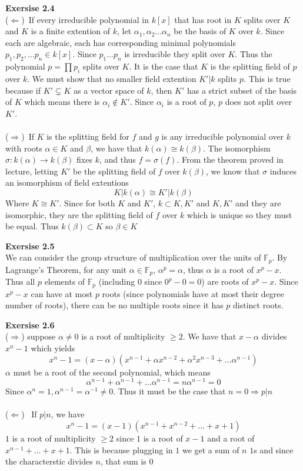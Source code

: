 \documentclass[12pt]{article}
\newenvironment{ques}[1]{\textbf{Exersise #1}\vspace{1 mm}\\ }{\bigskip}
\theoremstyle{definition}
\newcommand{\F}{\mathbb F}
\renewcommand{\a}{\alpha}
\begin{document}
\begin{ques}{2.4}
	($\Leftarrow$)\ If every irreducible polynomial in $k[x]$ that has root in
	$K$ splits over $K$ and $K$ is a finite extention of $k$, let $\a_1, \a_2
	\dots \a_n$ be the basis of $K$ over $k$. Since each are algebraic, each
	has corresponding minimal polynomials $p_1, p_2, \dots p_n \in k[x]$. Since
	$p_1 \dots p_n$ is irreducible they split over $K$. Thus the polynomial $p
	= \prod p_i$ splits over $K$. It is the case that $K$ is the splitting
	field of $p$ over $k$. We must show that no smaller field extention $K'|k$
	splits $p$. This is true because if $K' \subsetneq K$ as a vector space of
	$k$, then $K'$ has a strict subset of the basis of $K$ which means there is
	$\a_i \notin K'$. Since $\a_i$ is a root of $p$, $p$ does not split over $K'$.
	\\
	\\
	($\Rightarrow$)\ If $K$ is the splitting field for $f$ and $g$ is any
	irreducible polynomial over $k$ with roots $\a \in K$ and $\beta$, we have
	that $k(\a) \cong k(\beta)$. The isomorphism $\sigma: k(\a) \to k(\beta)$
	fixes $k$, and thus $f = \sigma(f)$. From the theorem proved in
	lecture, letting $K'$ be the splitting field of $f$ over $k(\beta)$, we
	know that $\sigma$ induces an isomorphism of field extentions $$K|k(\alpha)
	\cong K'|k(\beta)$$ Where $K \cong K'$. Since for both $K$ and $K'$, $k
	\subset K, K'$ and $K,K'$ and they are isomorphic, they are the splitting
	field of $f$ over $k$ which is unique so they must be equal.  Thus
	$k(\beta) \subset K$ so $\beta \in K$
\end{ques}

\begin{ques}{2.5}
	We can consider the group structure of multiplication over the units of
	$\F_p$. By Lagrange's Theorem, for any unit $\a \in \F_p$, $\a^p = \a$,
	thus $\a$ is a root of $x^p - x$. Thus all $p$ elements of $\F_p$
	(including $0$ since $0^p - 0 = 0$) are roots of $x^p - x$. Since $x^p - x$
	can have at most $p$ roots (since polynomials have at most their degree
	number of roots), there can be no multiple roots since it has $p$ distinct
	roots.
\end{ques}

\begin{ques}{2.6}
	($\Rightarrow$) suppose $\a \neq 0$ is a root of multiplicity $\geq 2$. We have
	that $x-\a$ divides $x^n - 1$ which yields
	$$x^n - 1 = (x - \a)(x^{n-1} + \a x^{n-2} + \a^2x^{n-3} + \dots \a^{n-1})$$
	$\a$ must be a root of the second polynomial, which means
	$$\a^{n-1} + \a^{n-1} + \dots \a^{n-1} = n\a^{n-1} = 0$$
	Since $\a^n = 1, \a^{n-1} = \a^{-1} \neq 0$. Thus it must be the case that
	$n = 0 \Rightarrow p|n$\\
	\\
	($\Leftarrow$) \ If $p | n$, we have
	$$x^n - 1 = (x - 1)(x^{n-1} + x^{n-2} + \dots + x + 1)$$
	$1$ is a root of multiplicity $\geq 2$ since $1$ is a root of $x - 1$ and
	a root of $x^{n-1} + \dots + x + 1$. This is because plugging in $1$ we get
	a sum of $n$ $1$s and since the characterstic divides $n$, that sum is $0$
\end{ques}
\end{document}
